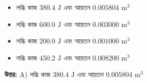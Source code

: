 \documentclass[12pt, a4paper]{article}
\begin{document}
\begin{itemize}[label={}, leftmargin=1cm, itemsep=0.5em]
    \item[\textbf{A)}] লব্ধি কাজ $380.4\text{ J}$ এবং আয়তন $0.005804\text{ m}^3$
    \item[\textbf{B)}] লব্ধি কাজ $600.0\text{ J}$ এবং আয়তন $0.003000\text{ m}^3$
    \item[\textbf{C)}] লব্ধি কাজ $200.0\text{ J}$ এবং আয়তন $0.001000\text{ m}^3$
    \item[\textbf{D)}] লব্ধি কাজ $450.2\text{ J}$ এবং আয়তন $0.008200\text{ m}^3$
\end{itemize}

\vspace{0.5em}
\begin{tcolorbox}[answerbox]
    \textbf{\color{success} উত্তর:} A) লব্ধি কাজ $380.4\text{ J}$ এবং আয়তন $0.005804\text{ m}^3$
\end{tcolorbox}
\vspace{1em}
\end{document}
